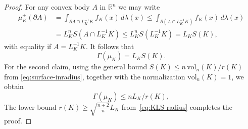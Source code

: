 \documentclass[11pt,leqno]{article}
\theoremstyle{remark}
\numberwithin{equation}{section}
\newcommand{\vol}{\mathrm{vol}}
\newcommand{\ls}{\leqslant}
\newcommand{\gr}{\geqslant}
\begin{document}
\begin{proof}For any convex body $A$ in $\mathbb{R}^n$ we may write
\begin{align*}\mu_K^+(\partial A) &=\int_{\partial A\cap L_K^{-1}K}f_K(x)\,d\lambda(x)\ls \int_{\partial (A\cap L_K^{-1}K)}f_K(x)\,d\lambda(x)\\
&=L_K^nS(A\cap L_K^{-1}K)\ls L_K^nS(L_K^{-1}K)=L_KS(K),\end{align*}
with equality if $A=L_K^{-1}K$. It follows that
$$\Gamma(\mu_K)=L_KS(K).$$ 
For the second claim, using the general bound $S(K)\ls n\,\vol_n(K)/r(K)$ from \eqref{eq:surface-inradius}, 
together with the normalization $\vol_n(K)=1$, we obtain
$$\Gamma(\mu_K)\ls nL_K/r(K),$$
The lower bound $r(K)\gr\sqrt{\frac{n+2}{n}} L_K$ from~\eqref{eq:KLS-radius} completes the proof. \end{proof}
\end{document}
